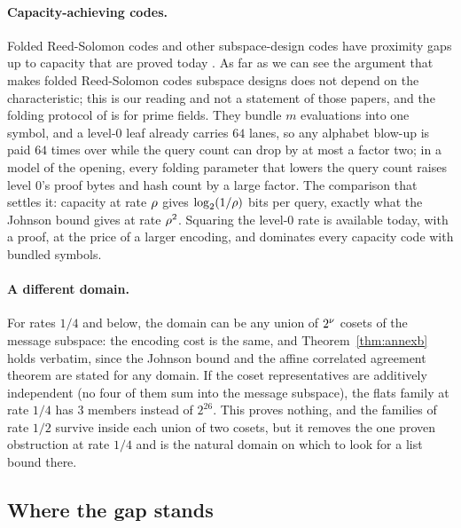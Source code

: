 \paragraph{Capacity-achieving codes.} Folded Reed-Solomon codes and other subspace-design codes have proximity gaps up to capacity that are proved today \cite{GG25,LXYYZ26}. As far as we can see the argument that makes folded Reed-Solomon codes subspace designs does not depend on the characteristic; this is our reading and not a statement of those papers, and the folding protocol of \cite{LXYYZ26} is for prime fields. They bundle $m$ evaluations into one symbol, and a level-$0$ leaf already carries $64$ lanes, so any alphabet blow-up is paid $64$ times over while the query count can drop by at most a factor two; in a model of the opening, every folding parameter that lowers the query count raises level $0$'s proof bytes and hash count by a large factor. The comparison that settles it: capacity at rate $\rho$ gives $\log_2(1/\rho)$ bits per query, exactly what the Johnson bound gives at rate $\rho^2$. Squaring the level-$0$ rate is available today, with a proof, at the price of a larger encoding, and dominates every capacity code with bundled symbols.

\paragraph{A different domain.} For rates $1/4$ and below, the domain can be any union of $2^{\nu}$ cosets of the message subspace: the encoding cost is the same, and Theorem~\ref{thm:annexb} holds verbatim, since the Johnson bound and the affine correlated agreement theorem are stated for any domain. If the coset representatives are additively independent (no four of them sum into the message subspace), the flats family at rate $1/4$ has $3$ members instead of $2^{26}$. This proves nothing, and the families of rate $1/2$ survive inside each union of two cosets, but it removes the one proven obstruction at rate $1/4$ and is the natural domain on which to look for a list bound there.

\subsection{Where the gap stands}\label{sec:gap}

